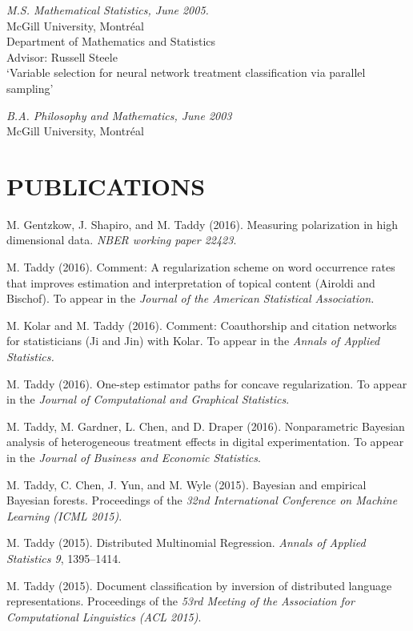 \documentclass[margin,line]{res}
\begin{document}
\begin{resume}
\vspace{-0.2cm}
{\it M.S. Mathematical Statistics, June 2005.}\\
{\sc McGill University, Montr\'eal}\\
Department of Mathematics and Statistics\\
Advisor: Russell Steele\\
`Variable selection for neural network treatment classification via parallel sampling'

\vspace{-0.2cm}
{\it B.A. Philosophy and Mathematics, June 2003}\\
{\sc McGill University, Montr\'eal}

\medskip
\section{\bf PUBLICATIONS}


M. Gentzkow, J. Shapiro, and M. Taddy (2016).  Measuring polarization in high dimensional data. {\em NBER working paper 22423}.


M. Taddy (2016). Comment: A regularization scheme on word occurrence rates that improves estimation and interpretation of topical content (Airoldi and Bischof). To appear in the {\it Journal of the American Statistical Association.} 

M. Kolar and M. Taddy (2016).  Comment: Coauthorship and citation networks for statisticians (Ji and Jin) with Kolar. To appear in the {\it Annals of Applied Statistics. }


M. Taddy (2016). One-step estimator paths for concave regularization.  To appear in the {\em Journal of Computational and Graphical Statistics}.

M. Taddy, M. Gardner, L. Chen, and D. Draper (2016).  Nonparametric Bayesian analysis of heterogeneous treatment effects in digital experimentation.  To appear in the {\em Journal of Business and Economic Statistics}.

M. Taddy, C. Chen, J. Yun, and M. Wyle (2015). Bayesian and empirical Bayesian forests.  Proceedings of the {\em 32nd International Conference on Machine Learning (ICML 2015)}.

M. Taddy (2015). Distributed Multinomial Regression.  {\em Annals of Applied Statistics 9}, 1395--1414.

M. Taddy (2015). Document classification by inversion of distributed language representations. Proceedings of the {\em 53rd Meeting of the Association for Computational Linguistics (ACL 2015)}.


\end{resume}
\end{document}
